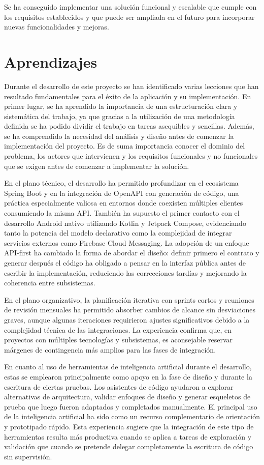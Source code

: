 Se ha conseguido implementar una solución funcional y escalable que cumple con los requisitos establecidos y que puede ser ampliada en el futuro para incorporar nuevas funcionalidades y mejoras.

\section{Aprendizajes}
\label{sec:aprendizajes}

Durante el desarrollo de este proyecto se han identificado varias lecciones que han resultado fundamentales para el éxito de la aplicación y su implementación. En primer lugar, se ha aprendido la importancia de una estructuración clara y sistemática del trabajo, ya que gracias a la utilización de una metodología definida se ha podido dividir el trabajo en tareas asequibles y sencillas. Además, se ha comprendido la necesidad del análisis y diseño antes de comenzar la implementación del proyecto. Es de suma importancia conocer el dominio del problema, los actores que intervienen y los requisitos funcionales y no funcionales que se exigen antes de comenzar a implementar la solución.

En el plano técnico, el desarrollo ha permitido profundizar en el ecosistema Spring Boot y en la integración de OpenAPI con generación de código, una práctica especialmente valiosa en entornos donde coexisten múltiples clientes consumiendo la misma API. También ha supuesto el primer contacto con el desarrollo Android nativo utilizando Kotlin y Jetpack Compose, evidenciando tanto la potencia del modelo declarativo como la complejidad de integrar servicios externos como Firebase Cloud Messaging. La adopción de un enfoque API-first ha cambiado la forma de abordar el diseño: definir primero el contrato y generar después el código ha obligado a pensar en la interfaz pública antes de escribir la implementación, reduciendo las correcciones tardías y mejorando la coherencia entre subsistemas.

En el plano organizativo, la planificación iterativa con sprints cortos y reuniones de revisión mensuales ha permitido absorber cambios de alcance sin desviaciones graves, aunque algunas iteraciones requirieron ajustes significativos debido a la complejidad técnica de las integraciones. La experiencia confirma que, en proyectos con múltiples tecnologías y subsistemas, es aconsejable reservar márgenes de contingencia más amplios para las fases de integración.

En cuanto al uso de herramientas de inteligencia artificial durante el desarrollo, estas se emplearon principalmente como apoyo en la fase de diseño y durante la escritura de ciertas pruebas. Los asistentes de código ayudaron a explorar alternativas de arquitectura, validar enfoques de diseño y generar esqueletos de prueba que luego fueron adaptados y completados manualmente. El principal uso de la inteligencia artificial ha sido como un recurso complementario de orientación y prototipado rápido. Esta experiencia sugiere que la integración de este tipo de herramientas resulta más productiva cuando se aplica a tareas de exploración y validación que cuando se pretende delegar completamente la escritura de código sin supervisión.

